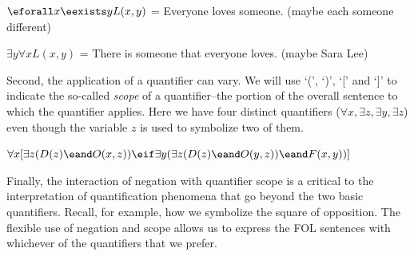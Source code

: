 \begin{argument}
\item[ ] $\eforall x\eexists y L(x,y)$ = Everyone loves someone. (maybe each
  someone different)
\item[ ] $\exists y\forall x L(x,y)$ = There is someone that everyone loves.
  (maybe Sara Lee) 
\end{argument}

Second, the application of a quantifier can vary. We will use `(', `)', `[' and
`]' to indicate the so-called \emph{scope} of a quantifier--the portion of the
overall sentence to which the quantifier applies. Here we have four distinct
quantifiers ($\forall x,\exists z,\exists y,\exists z$) even though the variable
$z$ is used to symbolize two of them.

\begin{argument}
\item[ ] $\forall x[\exists z(D(z)\eand O(x,z)) \eif
  \exists y(\exists z(D(z)\eand O(y,z)) \eand F(x,y))]$
\end{argument}

Finally, the interaction of negation with quantifier scope is a critical to the
interpretation of quantification phenomena that go beyond the two basic
quantifiers. Recall, for example, how we symbolize the square of opposition. The
flexible use of negation and scope allows us to express the FOL sentences with
whichever of the quantifiers that we prefer.


